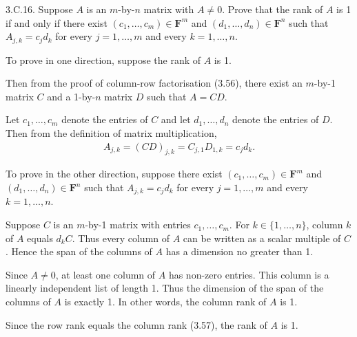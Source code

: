\documentclass[a5paper]{article}
\begin{document}
\newcommand   \C           {\mathbf{C}}
\newcommand   \R           {\mathbf{R}}
\renewcommand \L           {\mathcal{L}}
\newcommand   \F           {\mathbf{F}}
\renewcommand \P           {\mathcal{P}}
\newcommand   \M           {\mathcal{M}}
\newcommand   \op          {\operatorname}


    3.C.16.
    Suppose $A$ is an $m$-by-$n$ matrix with $A \neq 0$.
    Prove that the rank of $A$ is 1 if and only if there exist $(c_1,\dots,c_m) \in \F^m$ and $(d_1,\dots,d_n) \in \F^n$ such that $A_{j,k} = c_j d_k$ for every $j = 1,\dots,m$ and every $k = 1,\dots,n$.

    To prove in one direction, suppose the rank of $A$ is 1.

    Then from the proof of column-row factorisation (3.56), there exist an $m$-by-1 matrix $C$ and a 1-by-$n$ matrix $D$ such that $A = CD$.

    Let $c_1,\dots,c_m$ denote the entries of $C$ and let $d_1,\dots,d_n$ denote the entries of $D$.
    Then from the definition of matrix multiplication,
\begin{align*}
        A_{j,k} = (CD)_{j,k} = C_{j,1} D_{1,k} = c_j d_k .
\end{align*}

    To prove in the other direction, suppose there exist $(c_1,\dots,c_m) \in \F^m$ and $(d_1,\dots,d_n) \in \F^n$ such that $A_{j,k} = c_j d_k$ for every $j = 1,\dots,m$ and every $k = 1,\dots,n$.

    Suppose $C$ is an $m$-by-1 matrix with entries $c_1,\dots,c_m$.
    For $k \in \{1,\dots,n\}$, column $k$ of $A$ equals $d_k C$.
    Thus every column of $A$ can be written as a scalar multiple of $C$.
    Hence the span of the columns of $A$ has a dimension no greater than 1.

    Since $A \neq 0$, at least one column of $A$ has non-zero entries.
    This column is a linearly independent list of length 1.
    Thus the dimension of the span of the columns of $A$ is exactly 1.
    In other words, the column rank of $A$ is 1.

    Since the row rank equals the column rank (3.57), the rank of $A$ is 1.
\end{document}
